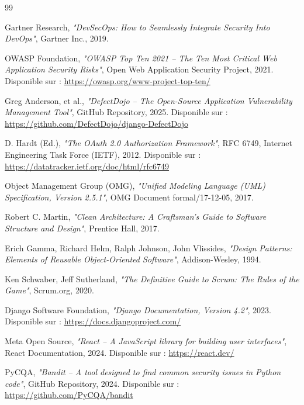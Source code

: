 \documentclass[12pt, a4paper, oneside]{report}
\begin{document}
\begin{thebibliography}{99}

    Gartner Research,
    \textit{"DevSecOps: How to Seamlessly Integrate Security Into DevOps"},
    Gartner Inc., 2019.

    OWASP Foundation,
    \textit{"OWASP Top Ten 2021 -- The Ten Most Critical Web Application Security Risks"},
    Open Web Application Security Project, 2021.
    Disponible sur : \url{https://owasp.org/www-project-top-ten/}

    Greg Anderson, et al.,
    \textit{"DefectDojo -- The Open-Source Application Vulnerability Management Tool"},
    GitHub Repository, 2025.
    Disponible sur : \url{https://github.com/DefectDojo/django-DefectDojo}

    D. Hardt (Ed.),
    \textit{"The OAuth 2.0 Authorization Framework"},
    RFC 6749, Internet Engineering Task Force (IETF), 2012.
    Disponible sur : \url{https://datatracker.ietf.org/doc/html/rfc6749}

    Object Management Group (OMG),
    \textit{"Unified Modeling Language (UML) Specification, Version 2.5.1"},
    OMG Document formal/17-12-05, 2017.

    Robert C. Martin,
    \textit{"Clean Architecture: A Craftsman's Guide to Software Structure and Design"},
    Prentice Hall, 2017.

    Erich Gamma, Richard Helm, Ralph Johnson, John Vlissides,
    \textit{"Design Patterns: Elements of Reusable Object-Oriented Software"},
    Addison-Wesley, 1994.

    Ken Schwaber, Jeff Sutherland,
    \textit{"The Definitive Guide to Scrum: The Rules of the Game"},
    Scrum.org, 2020.

    Django Software Foundation,
    \textit{"Django Documentation, Version 4.2"},
    2023.
    Disponible sur : \url{https://docs.djangoproject.com/}

    Meta Open Source,
    \textit{"React -- A JavaScript library for building user interfaces"},
    React Documentation, 2024.
    Disponible sur : \url{https://react.dev/}

    PyCQA,
    \textit{"Bandit -- A tool designed to find common security issues in Python code"},
    GitHub Repository, 2024.
    Disponible sur : \url{https://github.com/PyCQA/bandit}


\end{thebibliography}
\end{document}
